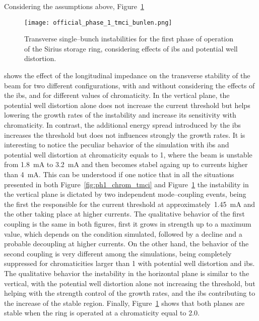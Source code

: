     Considering the assumptions above, Figure~\ref{fig:ph1_chrom_tmci_bunlen}
    \begin{figure}
        \centering
        \texttt{[image: official\_phase\_1\_tmci\_bunlen.png]}
        \caption{Transverse single--bunch instabilities for the first phase of operation of the Sirius storage ring, considering effects of \gls{ibs} and potential well distortion.}
        \label{fig:ph1_chrom_tmci_bunlen}
    \end{figure}
    shows the effect of the longitudinal impedance on the transverse stability of the beam for two different configurations, with and without considering the effects of the \gls{ibs}, and for different values of chromaticity. In the vertical plane, the potential well distortion alone does not increase the current threshold but helps lowering the growth rates of the instability and increase its sensitivity with chromaticity. In contrast, the additional energy spread introduced by the \gls{ibs} increases the threshold but does not influences strongly the growth rates. It is interesting to notice the peculiar behavior of the simulation with \gls{ibs} and potential well distortion at chromaticity equals to \num{1}, where the beam is unstable from \SI{1.8}{\milli\ampere} to \SI{3.2}{\milli\ampere} and then becomes stabel againg up to currents higher than \SI{4}{\milli\ampere}.
    This can be understood if one notice that in all the situations presented in both Figure~\ref{fig:ph1_chrom_tmci} and Figure~\ref{fig:ph1_chrom_tmci_bunlen} the instability in the vertical plane is dictated by two independent mode--coupling events, being the first the responsible for the current threshold at approximately~\SI{1.45}{\milli\ampere} and the other taking place at higher currents. The qualitative behavior of the first coupling is the same in both figures, first it grows in strength up to a maximum value, which depends on the condition simulated, followed by a decline and a probable decoupling at higher currents. On the other hand, the behavior of the second coupling is very different among the simulations, being completely suppressed for chromaticities larger than \num{1} with potential well distortion and \gls{ibs}. The qualitative behavior the instability in the horizontal plane is similar to the vertical, with the potential well distortion alone not increasing the threshold, but helping with the strength control of the growth rates, and the \gls{ibs} contributing to the increase of the stable region.
    Finally, Figure~\ref{fig:ph1_chrom_tmci_bunlen} shows that both planes are stable when the ring is operated at a chromaticity equal to \num{2.0}.


